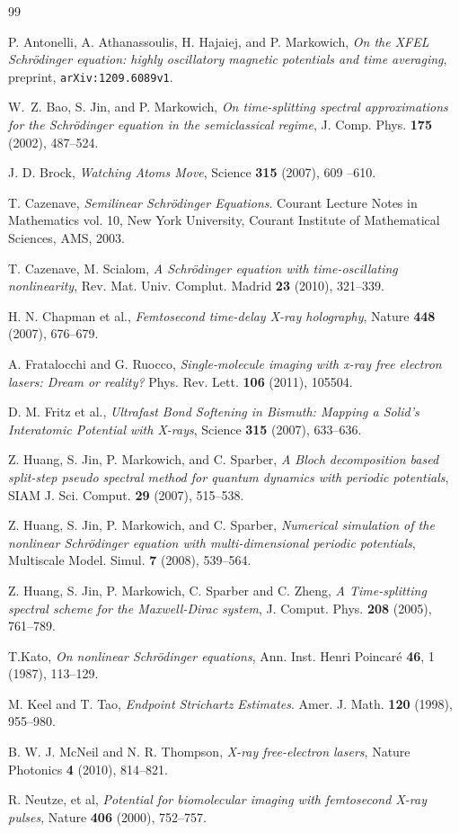\documentclass[10pt, leqno]{amsart}
\begin{document}
\begin{thebibliography}{99}

P. Antonelli, A. Athanassoulis, H. Hajaiej,
and P. Markowich, \emph{On the XFEL Schr\"odinger equation: highly
oscillatory magnetic potentials and time
averaging}, preprint, {\tt arXiv:1209.6089v1}.

 W.~Z. Bao, S. Jin, and P. Markowich,
\emph{On time-splitting spectral approximations for the
Schr\"odinger equation in the semiclassical regime}, J. Comp.
Phys. {\bf 175} (2002), 487--524.

 J. D. Brock,
\emph{Watching Atoms Move}, Science \textbf{315} (2007), 609 --610.

 T. Cazenave, \emph{Semilinear Schr\"odinger Equations}.
Courant Lecture Notes in Mathematics vol. 10, New York University, Courant Institute of Mathematical Sciences, AMS, 2003.

T. Cazenave, M. Scialom, \emph{A Schr\"odinger equation with time-oscillating nonlinearity}, Rev.
Mat. Univ. Complut. Madrid \textbf{23} (2010), 321--339.

H. N. Chapman et al., \emph{Femtosecond time-delay X-ray holography}, Nature \textbf{448} (2007), 676--679.

A. Fratalocchi and G. Ruocco, \emph{Single-molecule imaging with x-ray free electron
lasers: Dream or reality?} Phys. Rev. Lett. \textbf{106} (2011), 105504.

 D. M. Fritz et al.,
\emph{Ultrafast Bond Softening in Bismuth: Mapping a Solid's Interatomic Potential with X-rays}, Science \textbf{315} (2007), 633--636.

 Z. Huang, S. Jin, P. Markowich, and C. Sparber,
\emph{A Bloch decomposition based split-step pseudo spectral
method for quantum dynamics with periodic potentials}, SIAM J.
Sci. Comput. {\bf 29} (2007), 515--538.

 Z. Huang, S. Jin, P. Markowich, and C. Sparber,
\emph{Numerical simulation of the nonlinear Schr\"odinger equation
with multi-dimensional periodic potentials}, Multiscale Model.
Simul. \textbf{7} (2008), 539--564.

 Z. Huang, S. Jin, P. Markowich, C. Sparber and C. Zheng,
\emph{A Time-splitting spectral scheme for the Maxwell-Dirac
system}, J. Comput. Phys. {\bf 208} (2005), 761--789.

T.Kato, \emph{On nonlinear Schr\"odinger equations}, Ann. Inst. Henri Poincar\'e \textbf{46}, 1 (1987), 113--129.

 M. Keel and T. Tao, \emph{Endpoint Strichartz Estimates}.
Amer. J. Math. \textbf{120} (1998), 955--980.

 B. W. J. McNeil and N. R. Thompson, \emph{X-ray free-electron lasers},
Nature Photonics \textbf{4}  (2010), 814--821.

 R. Neutze, et al,
\emph{Potential for biomolecular imaging with femtosecond X-ray pulses}, Nature \textbf{406} (2000), 752--757.

\end{thebibliography}
\end{document}
